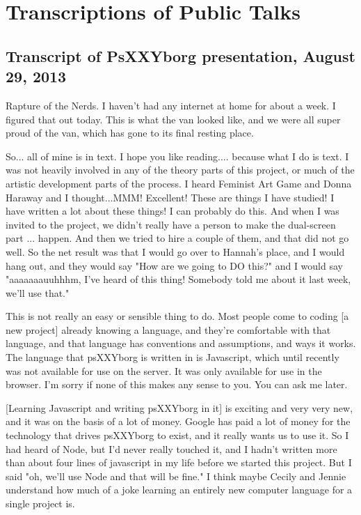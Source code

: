 
\chapter{Transcriptions of Public Talks} %

\label{AppendixE} %


\section{Transcript of PsXXYborg presentation, August 29, 2013}

Rapture of the Nerds. 
I haven't had any internet at home for about a week. I figured that out today. This is what the van looked like, and we were all super proud of the van, which has gone to its final resting place. 

So... all of mine is in text. I hope you like reading.... because what I do is text. I was not heavily involved in any of the theory parts of this project, or much of the artistic development parts of the process. I heard Feminist Art Game and Donna Haraway and I thought...MMM! Excellent! These are things I have studied! I have written a lot about these things! I can probably do this. And when I was invited to the project, we didn't really have a person to make the dual-screen part ... happen. And then we tried to hire a couple of them, and that did not go well. So the net result was that I would go over to Hannah's place, and I would hang out, and they would say "How are we going to DO this?" and I would say "aaaaaaauuhhhm, I've heard of this thing! Somebody told me about it last week, we'll use that." 

This is not really an easy or sensible thing to do. Most people come to coding [a new project] already knowing a language, and they're comfortable with that language, and that language has conventions and assumptions, and ways it works. The language that psXXYborg is written in is Javascript, which until recently was not available for use on the server. It was only available for use in the browser. I'm sorry if none of this makes any sense to you. You can ask me later. 

[Learning Javascript and writing psXXYborg in it] is exciting and very very new, and it was on the basis of a lot of money. Google has paid a lot of money for the technology that drives psXXYborg to exist, and it really wants us to use it. So I had heard of Node, but I'd never really touched it, and I hadn't written more than about four lines of javascript in my life before we started this project. But I said "oh, we'll use Node and that will be fine." I think maybe Cecily and Jennie understand how much of a joke learning an entirely new computer language for a single project is. 

